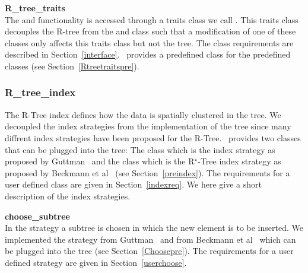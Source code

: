 \noindent
{\bf R\_tree\_traits}\\
\noindent
The 
and  functionality is
accessed through a traits class we call . This traits class decouples
the R-tree  from the 
and  class such that a modification of one of these classes
only affects this traits class but not the tree. 
The  class requirements are
described in  Section~\ref{interface}.
\cgal\ provides a predefined  class for the
predefined  classes (see Section~\ref{Rtreetraitspre}). 




\subsubsection{R\_tree\_index}
The R-Tree index defines how the data is spatially clustered in
the tree. We decoupled the index strategies from the
implementation of the tree since many diffrent index
strategies have been proposed for the R-Tree. \cgal\ provides two 
 classes that can be plugged into the tree: The
 class which is the index strategy as
proposed by Guttman~\cite{g-rtdis-84} and the 
class which is the R$^\star$-Tree index strategy as proposed by  Beckmann
et al~\cite{bkss-rtera-90} (see Section~\ref{preindex}). The
requirements for a user defined  class are
given in Section~\ref{indexreq}.
We here give a
short description of the index strategies.
\medskip

\noindent
{\bf choose\_subtree}\\
\noindent
In the  strategy a subtree is chosen in which 
the new element is to be inserted. 
We implemented
the  strategy from Guttman~\cite{g-rtdis-84}
and from Beckmann
et al~\cite{bkss-rtera-90} which can be plugged into the
tree (see Section~\ref{Choosepre}). The requirements for a user
defined  strategy are given in
Section~\ref{userchoose}.
\medskip

